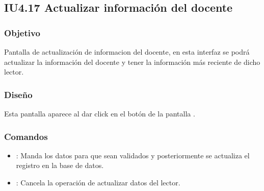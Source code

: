 \newpage
\subsection{IU4.17 Actualizar información del docente}

\subsubsection{Objetivo}
	Pantalla de actualización de informacion del docente, en esta interfaz se podrá actualizar la información del docente y tener la información más reciente de dicho lector.

\subsubsection{Diseño}
	Esta pantalla aparece al dar click en el botón  de la pantalla .


\subsubsection{Comandos}
	\begin{itemize}
		\item {}: Manda los datos para que sean validados y posteriormente se actualiza el registro en la base de datos.
		\item {}: Cancela la operación de actualizar datos del lector.
	\end{itemize}	


